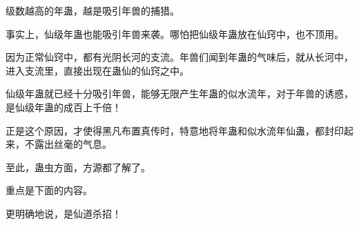 \begin{this_body}
级数越高的年蛊，越是吸引年兽的捕猎。

事实上，仙级年蛊也能吸引年兽来袭。哪怕把仙级年蛊放在仙窍中，也不顶用。

因为正常仙窍中，都有光阴长河的支流。年兽们闻到年蛊的气味后，就从长河中，进入支流里，直接出现在蛊仙的仙窍之中。

仙级年蛊就已经十分吸引年兽，能够无限产生年蛊的似水流年，对于年兽的诱惑，是仙级年蛊的成百上千倍！

正是这个原因，才使得黑凡布置真传时，特意地将年蛊和似水流年仙蛊，都封印起来，不露出丝毫的气息。

至此，蛊虫方面，方源都了解了。

重点是下面的内容。

更明确地说，是仙道杀招！

\end{this_body}


